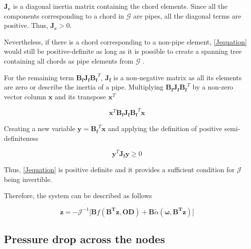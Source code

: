 $\bm{J_c}$ is a diagonal inertia matrix containing the chord elements. Since all the components corresponding to a chord in $\bm{\mathcal{G}}$ are pipes, all the 
diagonal terms are positive. Thus, $\bm{J_c} > 0$. 

Nevertheless, if there is a chord corresponding to a non-pipe element, \eqref{Jequation} 
would still be positive-definite as long as it is possible to create a spanning tree containing all chords as pipe elements from $\bm{\mathcal{G}}$ \cite{TowerModel}.

For the remaining term $\bm{B_f J_f {B_f}}^T$, $\bm{J_f}$ is a non-negative matrix as all its elements are zero or describe the inertia of a pipe. 
Multiplying $\bm{B_f J_f {B_f}}^T$ by a non-zero vector column $\mathbf{x}$ and its transpose $\mathbf{x}^{T}$

\begin{equation}
  \bm{x}^{T} \bm{B_f J_f {B_f}}^T \bm{x}
  \label{PosDefi}
\end{equation}

Creating a new variable $\bm{y} = \bm{B_f}^T \mathbf{x}$ and applying the definition of positive semi-definiteness 
\cite{MatrixBook}

\begin{equation}
  \bm{y}^{T} \bm{J_f y} \geqslant 0
  \label{PosDefEq}
\end{equation}

Thus, \eqref{Jequation} is positive definite and it provides a sufficient condition for $\bm{\mathcal{J}}$ being invertible. 

Therefore, the system can be described as follows

\begin{equation}
   \bm{\dot{z}} = -\bm{\mathcal{J}}^{-1} \Big[ \bm{B} f(\bm{B^T}\bm{z}, \bm{OD}) + \bm{B}\tilde{\alpha} (\bm{\omega},\bm{B^T}\bm{z}) \Big ]
   \label{ParatModelFinal}
 \end{equation}

\subsection{Pressure drop across the nodes}
\label{ModelRelationSection}



